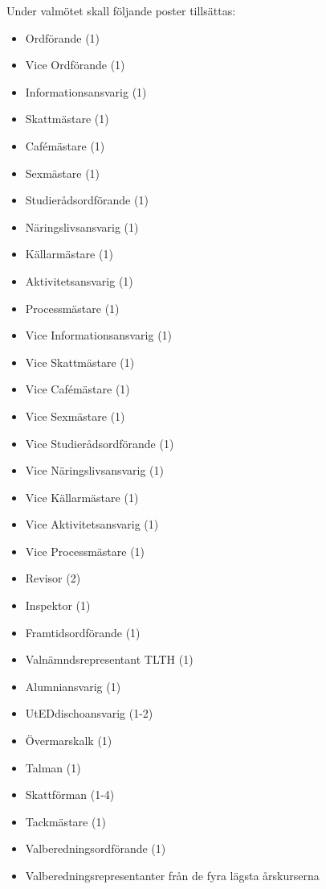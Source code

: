 \documentclass[pdfbookmarks,a4paper,11pt]{article}
\newlength{\itemcollength}
\newenvironment{reglemlista}{%
  \begin{list}{}{%
      \setlength{\labelwidth}{\itemcollength}%
      \setlength{\leftmargin}{\labelwidth + \labelsep}%
      \renewcommand{\makelabel}[1]{%
        \raisebox{0pt}[1ex][0pt]{%
          \makebox[\labelwidth][l]{%
            \parbox[t]{\itemcollength}{%
              \raggedright\hspace{0pt}##1}}}\hfill}%
      }}{%
  \end{list}}
\begin{document}
\begin{reglemlista}
	\item[Valmöte]
	Under valmötet skall följande poster tillsättas:
	\begin{itemize}
		\item Ordförande (1)
		\item Vice Ordförande (1)
		\item Informationsansvarig (1)
		\item Skattmästare (1)
		\item Cafémästare (1)
		\item Sexmästare (1)
		\item Studierådsordförande (1)
		\item Näringslivsansvarig (1)
		\item Källarmästare (1)
		\item Aktivitetsansvarig (1)
        \item Processmästare (1)
		\item Vice Informationsansvarig (1)
		\item Vice Skattmästare (1)
		\item Vice Cafémästare (1)
		\item Vice Sexmästare (1)
		\item Vice Studierådsordförande (1)
		\item Vice Näringslivsansvarig (1)
		\item Vice Källarmästare (1)
		\item Vice Aktivitetsansvarig (1)
        \item Vice Processmästare (1)
		\item Revisor (2)
		\item Inspektor (1)
		\item Framtidsordförande (1)
		\item Valnämndsrepresentant TLTH (1)
		\item Alumniansvarig (1)
		\item UtEDdischoansvarig (1-2)
		\item Övermarskalk (1)
		\item Talman (1)
		\item Skattförman (1-4)
		\item Tackmästare (1)
	\end{itemize}

	\item[Höstterminsmöte två]
	\begin{itemize}
		\item Valberedningsordförande (1)
		\item Valberedningsrepresentanter från de fyra lägsta årskurserna
	\end{itemize}


\end{reglemlista}
\end{document}
